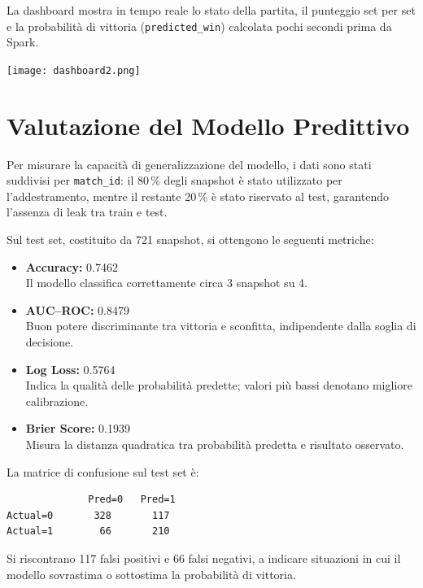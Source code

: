 \documentclass[a4paper,12pt]{report}
\begin{document}
La dashboard mostra in tempo reale lo stato della partita, il punteggio set per set e la probabilità di vittoria (\texttt{predicted\_win}) calcolata pochi secondi prima da Spark.

\noindent\begin{minipage}{\textwidth}
  \centering
    \texttt{[image: dashboard2.png]}
    \label{fig:dashboard}
\end{minipage}

\section{Valutazione del Modello Predittivo}

Per misurare la capacità di generalizzazione del modello, i dati sono stati suddivisi per \texttt{match\_id}: il 80\,\% degli snapshot è stato utilizzato per l’addestramento, mentre il restante 20\,\% è stato riservato al test, garantendo l’assenza di leak tra train e test.

Sul test set, costituito da 721 snapshot, si ottengono le seguenti metriche:

\begin{itemize}
  \item \textbf{Accuracy:} 0.7462 \\
    Il modello classifica correttamente circa 3 snapshot su 4.
  \item \textbf{AUC–ROC:} 0.8479 \\
    Buon potere discriminante tra vittoria e sconfitta, indipendente dalla soglia di decisione.
  \item \textbf{Log Loss:} 0.5764 \\
    Indica la qualità delle probabilità predette; valori più bassi denotano migliore calibrazione.
  \item \textbf{Brier Score:} 0.1939 \\
    Misura la distanza quadratica tra probabilità predetta e risultato osservato.
\end{itemize}

\noindent La matrice di confusione sul test set è:

\begin{verbatim}
              Pred=0   Pred=1
Actual=0       328       117
Actual=1        66       210
\end{verbatim}

Si riscontrano 117 falsi positivi e 66 falsi negativi, a indicare situazioni in cui il modello sovrastima o sottostima la probabilità di vittoria.
\end{document}
